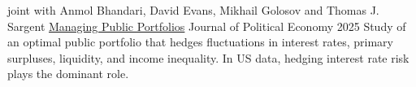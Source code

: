 

\begin{cventries}
	\cventry
	{joint with Anmol Bhandari, David Evans, Mikhail Golosov and Thomas J. Sargent} %
	{\href{https://doi.org/10.1086/738150}{Managing Public Portfolios}} %
	{Journal of Political Economy} %
	{2025} %
	{Study of an optimal public portfolio that hedges fluctuations in interest rates, primary surpluses, liquidity, and income inequality. In US data, hedging interest rate risk plays the dominant role.}
\end{cventries}

